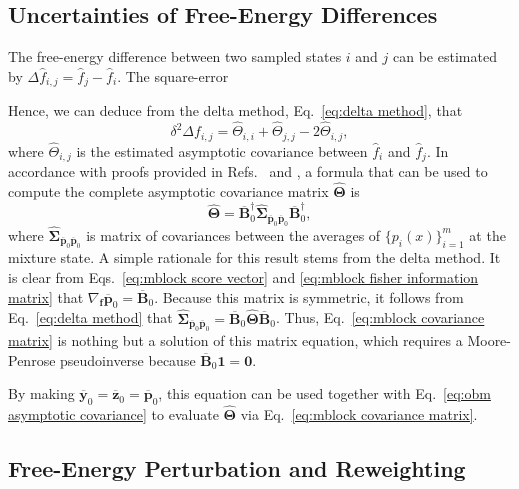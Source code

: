\documentclass[aip,jcp,reprint,amsmath,amssymb]{revtex4-1}
\newcommand{\mt}[1]{\boldsymbol{\mathbf{#1}}}           %
\newcommand{\vt}[1]{\boldsymbol{\mathbf{#1}}}           %
\begin{document}
\subsection{Uncertainties of Free-Energy Differences}

The free-energy difference between two sampled states $i$ and $j$ can be estimated by $\Delta \hat f_{i,j} = \hat f_j - \hat f_i$. The square-error 

Hence, we can deduce from the delta method, Eq.~\eqref{eq:delta method}, that
\begin{equation}
\delta^2 \Delta f_{i,j} = \hat \Theta_{i,i} + \hat \Theta_{j,j} - 2\hat \Theta_{i,j},
\end{equation}
where $\hat \Theta_{i,j}$ is the estimated asymptotic covariance between $\hat f_i$ and $\hat f_j$. In accordance with proofs provided in Refs.~ and , a formula that can be used to compute the complete asymptotic covariance matrix $\hat{\mt \Theta}$ is
\begin{equation}
\label{eq:mblock covariance matrix}
\hat{\mt \Theta} = \overline{\mt B}_0^\dag \hat{\mt \Sigma}_{\overline{\vt p}_0 \overline{\vt p}_0} \overline{\mt B}_0^\dag,
\end{equation}
where $\hat{\mt \Sigma}_{\overline{\vt p}_0 \overline{\vt p}_0}$ is matrix of covariances between the averages of $\{p_i(x)\}_{i=1}^m$ at the mixture state. A simple rationale for this result stems from the delta method. It is clear from Eqs.~\eqref{eq:mblock score vector} and \eqref{eq:mblock fisher information matrix} that $\nabla_{\vt f}\overline{\vt p}_0 = \overline{\mt B}_0$. Because this matrix is symmetric, it follows from Eq.~\eqref{eq:delta method} that $\hat{\mt \Sigma}_{\overline{\vt p}_0 \overline{\vt p}_0} = \overline{\mt B}_0 \hat{\mt \Theta} \overline{\mt B}_0$. Thus, Eq.~\eqref{eq:mblock covariance matrix} is nothing but a solution of this matrix equation, which requires a Moore-Penrose pseudoinverse because $\overline{\mt B}_0 \vt 1 = \vt 0$.

By making $\overline{\vt y}_0 = \overline{\vt z}_0 = \overline{\vt p}_0$, this equation can be used together with Eq.~\eqref{eq:obm asymptotic covariance} to evaluate $\hat{\mt \Theta}$ via Eq.~\eqref{eq:mblock covariance matrix}.

\subsection{Free-Energy Perturbation and Reweighting}
\end{document}
